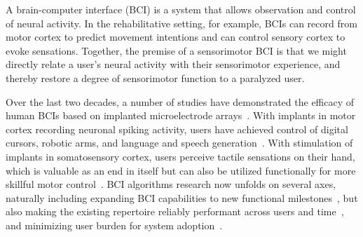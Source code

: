 \documentclass[12pt,oneside]{report}
\begin{document}
A brain-computer interface (BCI) is a system that allows observation and control of neural activity. In the rehabilitative setting, for example, BCIs can record from motor cortex to predict movement intentions and can control sensory cortex to evoke sensations. Together, the premise of a sensorimotor BCI is that we might directly relate a user's neural activity with their sensorimotor experience, and thereby restore a degree of sensorimotor function to a paralyzed user.

Over the last two decades, a number of studies have demonstrated the efficacy of human BCIs based on implanted microelectrode arrays~\citep{Brandman17Review,pandarinath_22_review}.
With implants in motor cortex recording neuronal spiking activity, users have achieved control of digital cursors, robotic arms, and language and speech generation~\citep{collinger2013high,willett_23_speech,wairagkar25voice,Pandarinath2017Pointandclick}.
With stimulation of implants in somatosensory cortex, users perceive tactile sensations on their hand, which is valuable as an end in itself but can also be utilized functionally for more skillful motor control~\citep{flesher2016intracortical,graczyk2024clinical,flesher2021functional,ArmentaSalas2018}.
BCI algorithms research now unfolds on several axes, naturally including expanding BCI capabilities to new functional milestones~\citep{willsey2024real,wairagkar25voice}, but also making the existing repertoire reliably performant across users and time~\citep{hosman2023months,fan2023plugandplay}, and minimizing user burden for system adoption~\citep{pandarinath_22_review,card2025long}.
\end{document}
